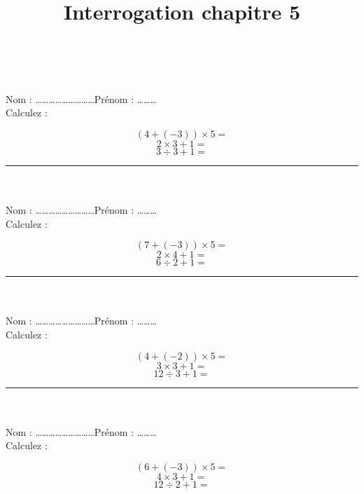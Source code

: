 \documentclass[14 pt]{extarticle}
\title{Interrogation chapitre 5}
\date{}
\theoremstyle{plain}
\newcommand{\exo}{
 \ \\ \ \\
 Nom : \ldots\ldots\ldots\ldots\ldots\ldots\ldots\ldots\ldots Prénom : \ldots\ldots\ldots \\ 
 Calculez :
  }
\begin{document}
 
 \exo
 \[ (4 + (-3) ) \times 5 =  \]
 \[ 2 \times 3 + 1 = \]
 \[ 3 \div 3 + 1 = \]
 \hrule
 \exo
 
 \[ (7 + (-3) ) \times 5 =  \]
 \[ 2 \times 4 + 1 = \]
 \[ 6  \div 2 + 1 = \]
 \hrule\exo 
 
 \[ (4 + (-2) ) \times 5 =  \]
 \[ 3 \times 3 + 1 = \]
 \[ 12 \div 3 + 1 = \]
 \hrule\exo 
 
 \[ (6 + (-3) ) \times 5 =  \]
 \[ 4 \times 3 + 1 = \]
 \[ 12 \div 2 + 1  =\]
 
 
 	
\end{document}
